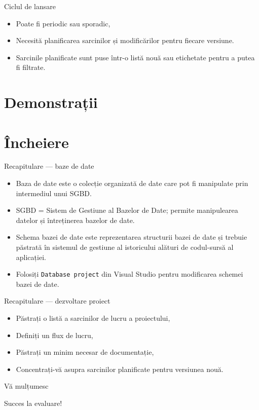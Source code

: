 \documentclass[presentation]{beamer}
\begin{document}
\begin{frame}[label={sec:org72a00f2}]{Ciclul de lansare}
\begin{itemize}
\item Poate fi periodic sau sporadic,
\item Necesită planificarea sarcinilor și modificărilor pentru fiecare versiune.
\item Sarcinile planificate sunt puse într-o listă nouă sau etichetate pentru a putea fi filtrate.
\end{itemize}
\end{frame}
\section{Demonstrații}
\label{sec:orga3055df}
\section{Încheiere}
\label{sec:orgf858f01}
\begin{frame}[label={sec:org91c8d78},fragile]{Recapitulare --- baze de date}
 \begin{itemize}
\item \alert{Baza de date} este o colecție organizată de date care pot fi manipulate prin intermediul unui SGBD.
\item \alert{SGBD} = Sistem de Gestiune al Bazelor de Date; permite manipulearea datelor și întreținerea bazelor de date.
\item \alert{Schema bazei de date} este reprezentarea structurii bazei de date și trebuie păstrată în sistemul de gestiune al istoricului alături de codul-sursă al aplicației.
\item Folosiți \texttt{Database project} din Visual Studio pentru modificarea schemei bazei de date.
\end{itemize}
\end{frame}
\begin{frame}[label={sec:org4079b4d}]{Recapitulare --- dezvoltare proiect}
\begin{itemize}
\item Păstrați o listă a sarcinilor de lucru a proiectului,
\item Definiți un flux de lucru,
\item Păstrați un minim necesar de documentație,
\item Concentrați-vă asupra sarcinilor planificate pentru versiunea nouă.
\end{itemize}
\end{frame}
\begin{frame}[label={sec:orgacfdbb2}]{Vă mulțumesc}
\begin{center}
Succes la evaluare!
\end{center}
\end{frame}
\end{document}
